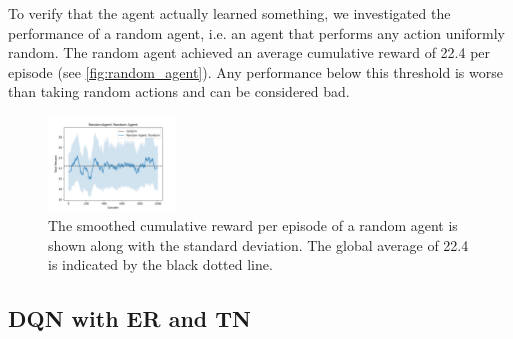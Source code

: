 \documentclass{article}
\begin{document}
To verify that the agent actually learned something, 
we investigated the performance of a random agent, 
i.e. an agent that performs any action uniformly random. 
The random agent achieved an average cumulative reward of 22.4 per episode (see \autoref{fig:random_agent}).
Any performance below this threshold is worse than taking random actions 
and can be considered bad.


\begin{figure}[ht!]
   \centering
   \includegraphics[width=0.3\textwidth]{assets/random_agent_cumulative_reward.png}
   \caption{The smoothed cumulative reward per episode of a random agent is shown 
      along with the standard deviation. The global average of 22.4 is indicated by the black dotted line.
   }
   \label{fig:random_agent}
\end{figure}

\subsection{DQN with ER and TN}
\label{subsec:dqn-with-er-and-tn}

\end{document}
